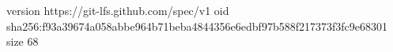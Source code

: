 version https://git-lfs.github.com/spec/v1
oid sha256:f93a39674a058abbe964b71beba4844356e6edbf97b588f217373f3fc9e68301
size 68
